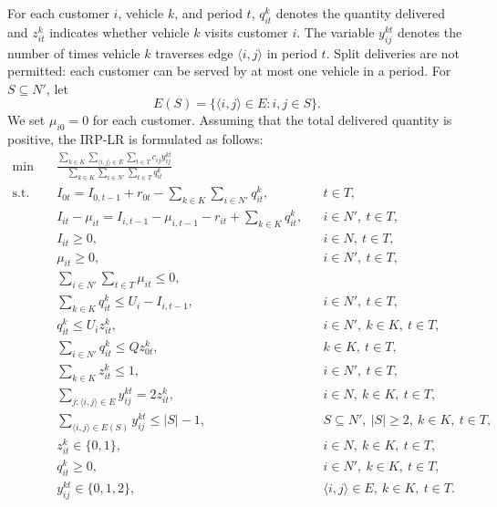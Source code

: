\documentclass{article}
\begin{document}
For each customer $i$, vehicle $k$, and period $t$, $q_{it}^{k}$ denotes
the quantity delivered and $z_{it}^{k}$ indicates whether vehicle $k$
visits customer $i$. The variable $y_{ij}^{kt}$ denotes the number of
times vehicle $k$ traverses edge $\langle i,j\rangle$ in period $t$.
Split deliveries are not permitted: each customer can be served by at most
one vehicle in a period. For $S\subseteq N'$, let
\[
    E(S)=\{\langle i,j\rangle\in E:i,j\in S\}.
\]
We set $\mu_{i0}=0$ for each customer. Assuming that the total delivered
quantity is positive, the IRP-LR is formulated as follows:
\small
\begin{align}
\min \quad &
\frac{
\displaystyle
\sum_{k\in K}
\sum_{\langle i,j\rangle\in E}
\sum_{t\in T}
c_{ij}y_{ij}^{kt}}
{
\displaystyle
\sum_{k\in K}
\sum_{i\in N'}
\sum_{t\in T}
q_{it}^{k}}
\label{obj}
\\
\text{s.t.}\quad
&
I_{0t}
=
I_{0,t-1}+r_{0t}
-
\sum_{k\in K}\sum_{i\in N'}q_{it}^{k},
&& t\in T,
\label{supbal}
\\
&
I_{it}-\mu_{it}
=
I_{i,t-1}-\mu_{i,t-1}-r_{it}
+
\sum_{k\in K}q_{it}^{k},
&& i\in N',\ t\in T,
\label{custbal}
\\
&
I_{it}\geq0,
&& i\in N,\ t\in T,
\label{nonneg_lnv}
\\
&
\mu_{it}\geq0,
&& i\in N',\ t\in T,
\label{nonneg_mu}
\\
&
\sum_{i\in N'}\sum_{t\in T}\mu_{it}\leq0,
&&
\label{zero stockout}
\\
&
\sum_{k\in K}q_{it}^{k}
\leq
U_i-I_{i,t-1},
&& i\in N',\ t\in T,
\label{maxinv}
\\
&
q_{it}^{k}
\leq U_i z_{it}^{k},
&& i\in N',\ k\in K,\ t\in T,
\label{link_qz}
\\
&
\sum_{i\in N'}q_{it}^{k}
\leq Qz_{0t}^{k},
&& k\in K,\ t\in T,
\label{vehcap}
\\
&
\sum_{k\in K}z_{it}^{k}\leq1,
&& i\in N',\ t\in T,
\label{nosplit}
\\
&
\sum_{j:\langle i,j\rangle\in E}y_{ij}^{kt}
=
2z_{it}^{k},
&& i\in N,\ k\in K,\ t\in T,
\label{routing1}
\\
&
\sum_{\langle i,j\rangle\in E(S)}
y_{ij}^{kt}
\leq |S|-1,
&&
S\subseteq N',\ |S|\geq2,\ k\in K,\ t\in T,
\label{subtour}
\\
&
z_{it}^{k}\in\{0,1\},
&& i\in N,\ k\in K,\ t\in T,
\label{binary_z}
\\
&
q_{it}^{k}\geq0,
&& i\in N',\ k\in K,\ t\in T,
\label{nonneg_q}
\\
&
y_{ij}^{kt}\in\{0,1,2\},
&&
\langle i,j\rangle\in E,\ k\in K,\ t\in T.
\label{domain_y}
\end{align}
\normalsize
\end{document}
